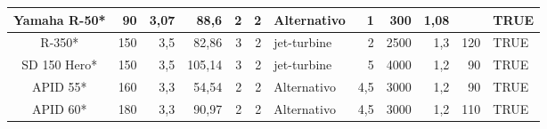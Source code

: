 \begin{table}[htbp]
\begin{tabular}{|c|r|r|r|r|r|l|r|r|r|r|l|}
		\midrule
		\rowcolor[rgb]{ .329,  .506,  .208} \textcolor[rgb]{ 1,  1,  1}{Yamaha R-50*} & \cellcolor[rgb]{ .659,  .816,  .553}90 & \cellcolor[rgb]{ .659,  .816,  .553}3,07 & \cellcolor[rgb]{ .659,  .816,  .553}88,6 & \cellcolor[rgb]{ .659,  .816,  .553}2 & \cellcolor[rgb]{ .659,  .816,  .553}2 & \cellcolor[rgb]{ .659,  .816,  .553}Alternativo & \cellcolor[rgb]{ .659,  .816,  .553}1 & \cellcolor[rgb]{ .659,  .816,  .553}300 & \cellcolor[rgb]{ .659,  .816,  .553}1,08 & \cellcolor[rgb]{ 1,  1,  0} & \cellcolor[rgb]{ .659,  .816,  .553}TRUE \\
		\midrule
		\rowcolor[rgb]{ .329,  .506,  .208} \textcolor[rgb]{ 1,  1,  1}{R-350*} & \cellcolor[rgb]{ .659,  .816,  .553}150 & \cellcolor[rgb]{ .659,  .816,  .553}3,5 & \cellcolor[rgb]{ .659,  .816,  .553}82,86 & \cellcolor[rgb]{ .659,  .816,  .553}3 & \cellcolor[rgb]{ .659,  .816,  .553}2 & \cellcolor[rgb]{ .659,  .816,  .553}jet-turbine & \cellcolor[rgb]{ .659,  .816,  .553}2 & \cellcolor[rgb]{ .659,  .816,  .553}2500 & \cellcolor[rgb]{ .659,  .816,  .553}1,3 & \cellcolor[rgb]{ .659,  .816,  .553}120 & \cellcolor[rgb]{ .659,  .816,  .553}TRUE \\
		\midrule
		\rowcolor[rgb]{ .329,  .506,  .208} \textcolor[rgb]{ 1,  1,  1}{SD 150 Hero*} & \cellcolor[rgb]{ .659,  .816,  .553}150 & \cellcolor[rgb]{ .659,  .816,  .553}3,5 & \cellcolor[rgb]{ .659,  .816,  .553}105,14 & \cellcolor[rgb]{ .659,  .816,  .553}3 & \cellcolor[rgb]{ .659,  .816,  .553}2 & \cellcolor[rgb]{ .659,  .816,  .553}jet-turbine & \cellcolor[rgb]{ .659,  .816,  .553}5 & \cellcolor[rgb]{ .659,  .816,  .553}4000 & \cellcolor[rgb]{ .659,  .816,  .553}1,2 & \cellcolor[rgb]{ .659,  .816,  .553}90 & \cellcolor[rgb]{ .659,  .816,  .553}TRUE \\
		\midrule
		\rowcolor[rgb]{ .329,  .506,  .208} \textcolor[rgb]{ 1,  1,  1}{APID 55*} & \cellcolor[rgb]{ .659,  .816,  .553}160 & \cellcolor[rgb]{ .659,  .816,  .553}3,3 & \cellcolor[rgb]{ .659,  .816,  .553}54,54 & \cellcolor[rgb]{ .659,  .816,  .553}2 & \cellcolor[rgb]{ .659,  .816,  .553}2 & \cellcolor[rgb]{ .659,  .816,  .553}Alternativo & \cellcolor[rgb]{ .659,  .816,  .553}4,5 & \cellcolor[rgb]{ .659,  .816,  .553}3000 & \cellcolor[rgb]{ .659,  .816,  .553}1,2 & \cellcolor[rgb]{ .659,  .816,  .553}90 & \cellcolor[rgb]{ .659,  .816,  .553}TRUE \\
		\midrule
		\rowcolor[rgb]{ .329,  .506,  .208} \textcolor[rgb]{ 1,  1,  1}{APID 60*} & \cellcolor[rgb]{ .659,  .816,  .553}180 & \cellcolor[rgb]{ .659,  .816,  .553}3,3 & \cellcolor[rgb]{ .659,  .816,  .553}90,97 & \cellcolor[rgb]{ .659,  .816,  .553}2 & \cellcolor[rgb]{ .659,  .816,  .553}2 & \cellcolor[rgb]{ .659,  .816,  .553}Alternativo & \cellcolor[rgb]{ .659,  .816,  .553}4,5 & \cellcolor[rgb]{ .659,  .816,  .553}3000 & \cellcolor[rgb]{ .659,  .816,  .553}1,2 & \cellcolor[rgb]{ .659,  .816,  .553}110 & \cellcolor[rgb]{ .659,  .816,  .553}TRUE \\

\end{tabular}
\end{table}
